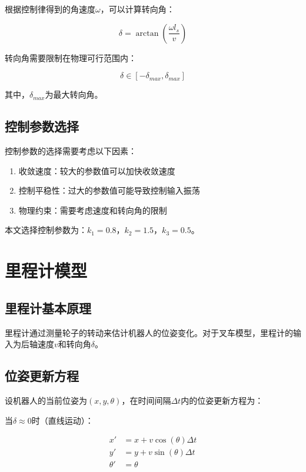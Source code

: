 \documentclass[12pt,a4paper]{report}
\begin{document}
根据控制律得到的角速度$\omega$，可以计算转向角：

\begin{equation}
\delta = \arctan\left(\frac{\omega l_s}{v}\right)
\end{equation}

转向角需要限制在物理可行范围内：

\begin{equation}
\delta \in [-\delta_{max}, \delta_{max}]
\end{equation}

其中，$\delta_{max}$为最大转向角。

\section{控制参数选择}

控制参数的选择需要考虑以下因素：

\begin{enumerate}[itemsep=0pt]
    \item 收敛速度：较大的参数值可以加快收敛速度
    \item 控制平稳性：过大的参数值可能导致控制输入振荡
    \item 物理约束：需要考虑速度和转向角的限制
\end{enumerate}

本文选择控制参数为：$k_1 = 0.8$，$k_2 = 1.5$，$k_3 = 0.5$。

\chapter{里程计模型}

\section{里程计基本原理}

里程计通过测量轮子的转动来估计机器人的位姿变化。对于叉车模型，里程计的输入为后轴速度$v$和转向角$\delta$。

\section{位姿更新方程}

设机器人的当前位姿为$(x, y, \theta)$，在时间间隔$\Delta t$内的位姿更新方程为：

当$\delta \approx 0$时（直线运动）：

\begin{align}
x' &= x + v \cos(\theta) \Delta t \\
y' &= y + v \sin(\theta) \Delta t \\
\theta' &= \theta
\end{align}
\end{document}
